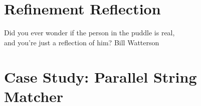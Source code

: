 
% 



\chapter{Refinement Reflection}\label{refinementrflection}

\makequote
  {Did you ever wonder if the person in the puddle is real, \\
  and you're just a reflection of him?}
  {Bill Watterson}











\chapter{Case Study: Parallel String Matcher}\label{stringmatcher}









